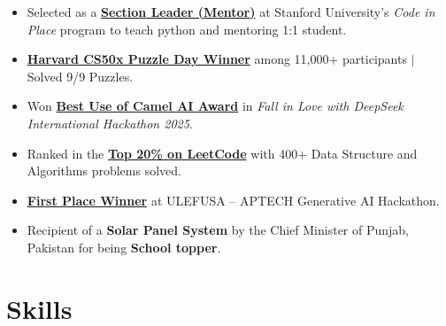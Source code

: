 \documentclass[a4paper,12pt]{article}
\begin{document}
\begin{itemize}[leftmargin=*]
    \item Selected as a \href{https://digitalcredential.stanford.edu/check/FA458483850B4B635DD0915130CCBEBF00F195AFCBF6991EE7448725533BAAB2LzFqZHI1YU9SSmVRZFpMQjVXV0xjdkxuWktYOExkU2RBZE85SFF6YmlPZGZLZDA0}{\textbf{Section Leader (Mentor)}} at Stanford University’s \textit{Code in Place} program to teach python and mentoring 1:1 student.
    \item \href{https://www.linkedin.com/posts/muhammad-qasim-gill_cs50-harvard-puzzleday2025-activity-7316559580790972418-4B6G?utm_source=share&utm_medium=member_desktop&rcm=ACoAACG6gOwBnlfoWP0KSUXYMZV0hE4WXwmWsBQ}{\textbf{Harvard CS50x Puzzle Day Winner}} among 11,000+ participants $|$ Solved 9/9 Puzzles.
    \item Won \href{https://lablab.ai/event/fall-in-love-with-deepseek/shallowseekers/ai-powered-personal-finance-assistant}{\textbf{Best Use of Camel AI Award}} in \textit{Fall in Love with DeepSeek International Hackathon 2025}.
    \item Ranked in the \href{https://leetcode.com/u/MuhammadQasim007/}{\textbf{Top 20\% on LeetCode}} with 400+ Data Structure and Algorithms problems solved.
    \item \href{https://www.linkedin.com/posts/muhammad-qasim-gill_celebrating-the-top-10-hackathon-winners-activity-7304649229472309248--oea?utm_source=share&utm_medium=member_desktop&rcm=ACoAACG6gOwBnlfoWP0KSUXYMZV0hE4WXwmWsBQ}{\textbf{First Place Winner}} at ULEFUSA – APTECH Generative AI Hackathon.
    \item Recipient of a \textbf{Solar Panel System} by the Chief Minister of Punjab, Pakistan for being \textbf{School topper}.
\end{itemize}


\section{Skills}
\end{document}
